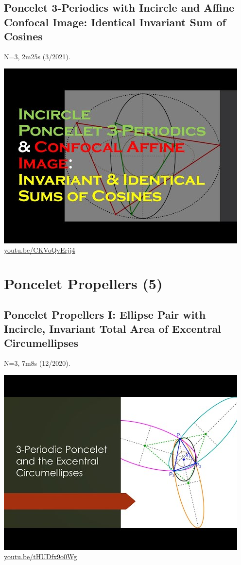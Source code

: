 \documentclass[12pt]{amsart}
\begin{document}
\subsection{Poncelet 3-Periodics with Incircle and Affine Confocal Image: Identical Invariant Sum of Cosines}
\label{vid:CKVoQvErjj4}
\noindent N=3, 2m25s (3/2021). 
\begin{center}\includegraphics[width=.5\textwidth]{pics/CKVoQvErjj4.jpg} \\ 
\href{https://youtu.be/CKVoQvErjj4}{\url{youtu.be/CKVoQvErjj4}}\end{center}
% 


\section{Poncelet Propellers (5)}

\subsection{Poncelet Propellers I: Ellipse Pair with Incircle, Invariant Total Area of Excentral Circumellipses}
\label{vid:tHUDfx9o0Wg}
\noindent N=3, 7m8s (12/2020). 
\begin{center}\includegraphics[width=.5\textwidth]{pics/tHUDfx9o0Wg.jpg} \\ 
\href{https://youtu.be/tHUDfx9o0Wg}{\url{youtu.be/tHUDfx9o0Wg}}\end{center}
% 
\end{document}
